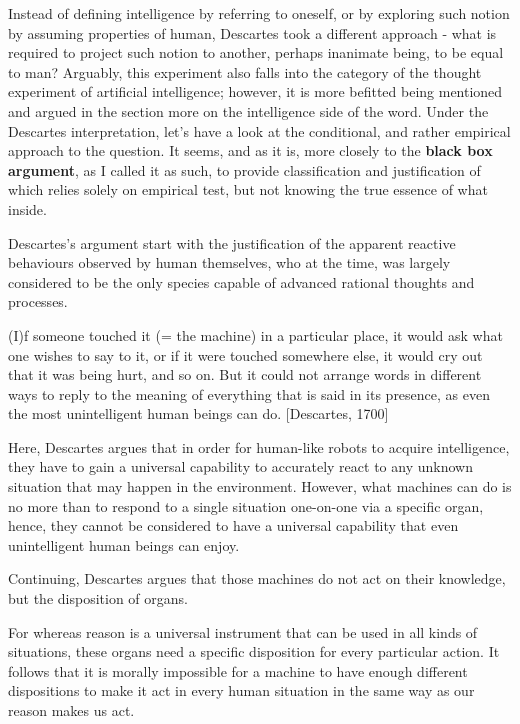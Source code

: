 Instead of defining intelligence by referring to oneself, or by exploring such notion by assuming properties of human, Descartes took a different approach - what is required to project such notion to another, perhaps inanimate being, to be equal to man? Arguably, this experiment also falls into the category of the thought experiment of artificial intelligence; however, it is more befitted being mentioned and argued in the section more on the intelligence side of the word. Under the Descartes interpretation, let's have a look at the conditional, and rather empirical approach to the question. It seems, and as it is, more closely to the \textbf{black box argument}, as I called it as such, to provide classification and justification of which relies solely on empirical test, but not knowing the true essence of what inside. \cite{Descartes1950-DESDOM}

Descartes's argument start with the justification of the apparent reactive behaviours observed by human themselves, who at the time, was largely considered to be the only species capable of advanced rational thoughts and processes. 

\begin{displayquote}
    (I)f someone touched it (= the machine) in a particular place, it would ask what one wishes to say to it, or if it were touched somewhere else, it would cry out that it was being hurt, and so on. But it could not arrange words in different ways to reply to the meaning of everything that is said in its presence, as even the most unintelligent human beings can do. [Descartes, 1700]
\end{displayquote}

Here, Descartes argues that in order for human-like robots to acquire intelligence, they have to gain a universal capability to accurately react to any unknown situation that may happen in the environment. However, what machines can do is no more than to respond to a single situation one-on-one via a specific organ, hence, they cannot be considered to have a universal capability that even unintelligent human beings can enjoy. 

Continuing, Descartes argues that those machines do not act on their knowledge, but the disposition of organs.

\begin{displayquote}
    For whereas reason is a universal instrument that can be used in all kinds of situations, these organs need a specific disposition for every particular action. It follows that it is morally impossible for a machine to have enough different dispositions to make it act in every human situation in the same way as our reason makes us act.
\end{displayquote}

